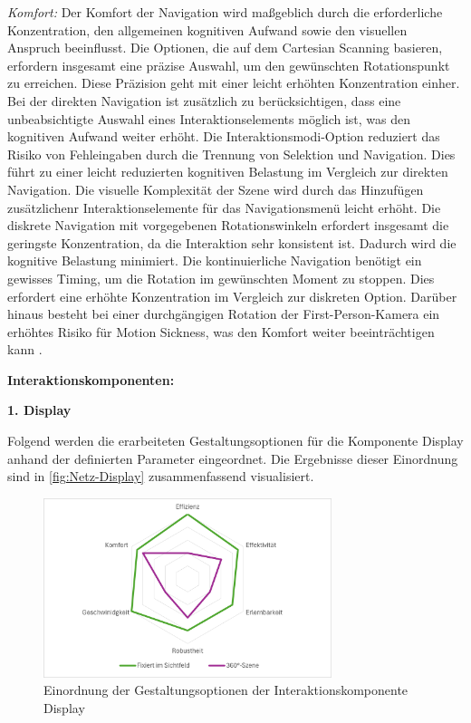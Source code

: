 \textit{Komfort:}
Der Komfort der Navigation wird maßgeblich durch die erforderliche Konzentration, den allgemeinen kognitiven Aufwand sowie den visuellen Anspruch beeinflusst. Die Optionen, die auf dem Cartesian Scanning basieren, erfordern insgesamt eine präzise Auswahl, um den gewünschten Rotationspunkt zu erreichen. Diese Präzision geht mit einer leicht erhöhten Konzentration einher. Bei der direkten Navigation ist zusätzlich zu berücksichtigen, dass eine unbeabsichtigte Auswahl eines Interaktionselements möglich ist, was den kognitiven Aufwand weiter erhöht. Die Interaktionsmodi-Option reduziert das Risiko von Fehleingaben durch die Trennung von Selektion und Navigation. Dies führt zu einer leicht reduzierten kognitiven Belastung im Vergleich zur direkten Navigation. Die visuelle Komplexität der Szene wird durch das Hinzufügen zusätzlichenr Interaktionselemente für das Navigationsmenü leicht erhöht. Die diskrete Navigation mit vorgegebenen Rotationswinkeln erfordert insgesamt die geringste Konzentration, da die Interaktion sehr konsistent ist. Dadurch wird die kognitive Belastung minimiert.
Die kontinuierliche Navigation benötigt ein gewisses Timing, um die Rotation im gewünschten Moment zu stoppen. Dies erfordert eine erhöhte Konzentration im Vergleich zur diskreten Option. Darüber hinaus besteht bei einer durchgängigen Rotation der First-Person-Kamera ein erhöhtes Risiko für Motion Sickness, was den Komfort weiter beeinträchtigen kann \citep{10.1007/s10055-020-00425-x, 8797722}.


{\normalfont \bfseries Interaktionskomponenten:} 

\textbf{1. Display}

Folgend werden die erarbeiteten Gestaltungsoptionen für die Komponente Display anhand der definierten Parameter eingeordnet. Die Ergebnisse dieser Einordnung sind in \autoref{fig:Netz-Display} zusammenfassend visualisiert.

\begin{figure}[tbh]
    \centering
    \includegraphics[width=0.75\textwidth]{images/Netzdiagramm-Display.png}
    \caption{Einordnung der Gestaltungsoptionen der Interaktionskomponente Display}
    \label{fig:Netz-Display}
\end{figure}

